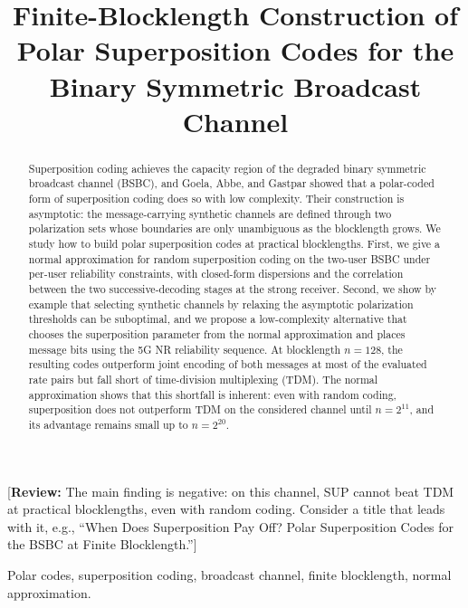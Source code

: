 \documentclass[conference]{IEEEtran}
\newcommand{\reviewnote}[1]{{\color{red}\footnotesize[\textbf{Review:} #1]}}
\begin{document}
\title{Finite-Blocklength Construction of Polar Superposition Codes for the Binary Symmetric Broadcast Channel}

\author{
}

\maketitle

\begin{abstract}
Superposition coding achieves the capacity region of the degraded binary symmetric broadcast channel (BSBC), and Goela, Abbe, and Gastpar showed that a polar-coded form of superposition coding does so with low complexity. Their construction is asymptotic: the message-carrying synthetic channels are defined through two polarization sets whose boundaries are only unambiguous as the blocklength grows. We study how to build polar superposition codes at practical blocklengths. First, we give a normal approximation for random superposition coding on the two-user BSBC under per-user reliability constraints, with closed-form dispersions and the correlation between the two successive-decoding stages at the strong receiver. Second, we show by example that selecting synthetic channels by relaxing the asymptotic polarization thresholds can be suboptimal, and we propose a low-complexity alternative that chooses the superposition parameter from the normal approximation and places message bits using the 5G NR reliability sequence. At blocklength $n=128$, the resulting codes outperform joint encoding of both messages at most of the evaluated rate pairs but fall short of time-division multiplexing (TDM). The normal approximation shows that this shortfall is inherent: even with random coding, superposition does not outperform TDM on the considered channel until $n=2^{11}$, and its advantage remains small up to $n=2^{20}$.
\end{abstract}
\reviewnote{The main finding is negative: on this channel, SUP cannot beat TDM at practical blocklengths, even with random coding. Consider a title that leads with it, e.g., ``When Does Superposition Pay Off? Polar Superposition Codes for the BSBC at Finite Blocklength.''}


\begin{IEEEkeywords}
Polar codes, superposition coding, broadcast channel, finite blocklength, normal approximation.
\end{IEEEkeywords}
\end{document}

